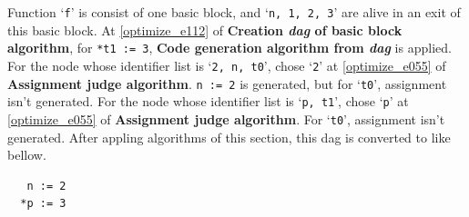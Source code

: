 \begin{Example}
Function `{\tt{f}}' is consist of one basic block, and 
`{\tt{n, 1, 2, 3}}' are alive in an exit of this basic block.
At \ref{optimize_e112} of {\bf Creation {\em dag} of basic block algorithm},
for {\tt{*t1 := 3}},
{\bf Code generation algorithm from {\em dag}} is applied.
For the node whose identifier list is `{\tt{2, n, t0}}',
chose `{\tt{2}}'
at \ref{optimize_e055} of {\bf Assignment judge algorithm}.
{\tt{n := 2}} is generated, but for `{\tt{t0}}', 
assignment isn't generated.
For the node whose identifier list is `{\tt{p, t1}}',
chose `{\tt{p}}'
at \ref{optimize_e055} of {\bf Assignment judge algorithm}.
For `{\tt{t0}}', 
assignment isn't generated. 
After appling algorithms of this section,
this dag is converted to like bellow.
\begin{verbatim}
   n := 2
  *p := 3
\end{verbatim}
\end{Example}

